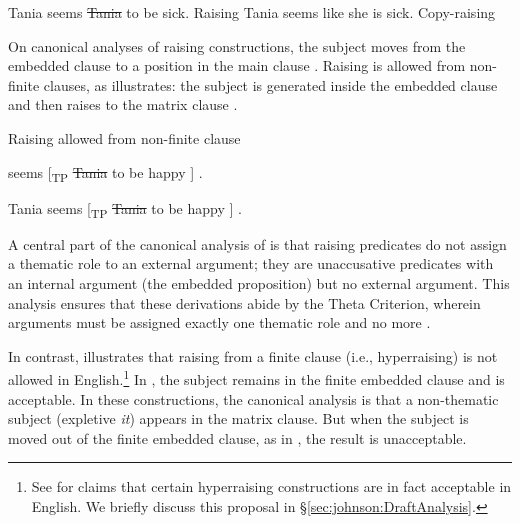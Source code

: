 \documentclass[output=paper,colorlinks,citecolor=brown
]{langscibook}
\begin{document}
\ea \label{ex:johnson:EnglishCopyRaisingContrast}
\begin{xlist}

\ex Tania seems \sout{Tania} to be sick.\label{ex:johnson:TrueRaising} \hfill {Raising}
\ex Tania seems like she is sick. \label{ex:johnson:EnglishCopyRaising2} \hfill {Copy-raising}

\end{xlist}
\z 


On canonical analyses of raising constructions, the subject moves from the embedded clause to a position in the main clause \citep{DaviesDubinsky2008RaisingControl,Polinsky2013RaisingControlOverview}. Raising is allowed from non-finite clauses, as  illustrates: the subject is generated inside the embedded clause  and then raises to the matrix clause .

\ea \label{ex:johnson:EnglishGoodRaising}

{{Raising allowed from non-finite clause}}

\begin{xlist}

\ex\label{ex:johnson:EnglishGoodRaisingBase}
\gap{} seems [\textsubscript{TP} \sout{Tania} to be happy ] .


\ex\label{ex:johnson:EnglishGoodRaisingSurface}
Tania seems [\textsubscript{TP} \sout{Tania} to be happy ] .

\end{xlist}
\z 


\noindent A central part of the canonical analysis of  is that raising predicates do not assign a thematic role to an external argument; they are unaccusative predicates with an internal argument (the embedded proposition) but no external argument. This analysis ensures that these derivations abide by the Theta Criterion, wherein arguments must be assigned exactly one thematic role and no more \citep{chomsky1993lectures}. 

In contrast,  illustrates that raising from a finite clause (i.e., hyperraising) is not allowed in English.\footnote{See \citet{Greeson2023EnglishHr} for claims that certain hyperraising constructions are in fact acceptable in English. We briefly discuss this proposal in \S\ref{sec:johnson:DraftAnalysis}.} In , the subject remains in the finite embedded clause and is acceptable. In these constructions, the canonical analysis is that a non-thematic subject (expletive \textit{it}) appears in the matrix clause. But when the subject is moved out of the finite embedded clause, as in , the result is unacceptable.
\end{document}
